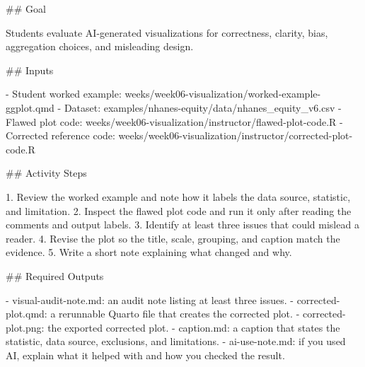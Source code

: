 \documentclass[
  letterpaper,
  DIV=11,
  numbers=noendperiod,
  oneside]{scrreprt}
\newenvironment{Shaded}{\begin{snugshade}}{\end{snugshade}}
\newcommand{\FunctionTok}[1]{\textcolor[rgb]{0.28,0.35,0.67}{#1}}
\newcommand{\InformationTok}[1]{\textcolor[rgb]{0.37,0.37,0.37}{#1}}
\newcommand{\NormalTok}[1]{\textcolor[rgb]{0.00,0.23,0.31}{#1}}
\newcommand{\SpecialStringTok}[1]{\textcolor[rgb]{0.13,0.47,0.30}{#1}}
\begin{document}
\begin{Shaded}
\begin{Highlighting}[numbers=left,,]
\FunctionTok{\#\# Goal}

\NormalTok{Students evaluate AI{-}generated visualizations for correctness, clarity, bias, aggregation choices, and misleading design.}

\FunctionTok{\#\# Inputs}

\SpecialStringTok{{-} }\NormalTok{Student worked example: }\InformationTok{\textasciigrave{}weeks/week06{-}visualization/worked{-}example{-}ggplot.qmd\textasciigrave{}}
\SpecialStringTok{{-} }\NormalTok{Dataset: }\InformationTok{\textasciigrave{}examples/nhanes{-}equity/data/nhanes\_equity\_v6.csv\textasciigrave{}}
\SpecialStringTok{{-} }\NormalTok{Flawed plot code: }\InformationTok{\textasciigrave{}weeks/week06{-}visualization/instructor/flawed{-}plot{-}code.R\textasciigrave{}}
\SpecialStringTok{{-} }\NormalTok{Corrected reference code: }\InformationTok{\textasciigrave{}weeks/week06{-}visualization/instructor/corrected{-}plot{-}code.R\textasciigrave{}}

\FunctionTok{\#\# Activity Steps}

\SpecialStringTok{1. }\NormalTok{Review the worked example and note how it labels the data source, statistic, and limitation.}
\SpecialStringTok{2. }\NormalTok{Inspect the flawed plot code and run it only after reading the comments and output labels.}
\SpecialStringTok{3. }\NormalTok{Identify at least three issues that could mislead a reader.}
\SpecialStringTok{4. }\NormalTok{Revise the plot so the title, scale, grouping, and caption match the evidence.}
\SpecialStringTok{5. }\NormalTok{Write a short note explaining what changed and why.}

\FunctionTok{\#\# Required Outputs}

\SpecialStringTok{{-} }\InformationTok{\textasciigrave{}visual{-}audit{-}note.md\textasciigrave{}}\NormalTok{: an audit note listing at least three issues.}
\SpecialStringTok{{-} }\InformationTok{\textasciigrave{}corrected{-}plot.qmd\textasciigrave{}}\NormalTok{: a rerunnable Quarto file that creates the corrected plot.}
\SpecialStringTok{{-} }\InformationTok{\textasciigrave{}corrected{-}plot.png\textasciigrave{}}\NormalTok{: the exported corrected plot.}
\SpecialStringTok{{-} }\InformationTok{\textasciigrave{}caption.md\textasciigrave{}}\NormalTok{: a caption that states the statistic, data source, exclusions, and limitations.}
\SpecialStringTok{{-} }\InformationTok{\textasciigrave{}ai{-}use{-}note.md\textasciigrave{}}\NormalTok{: if you used AI, explain what it helped with and how you checked the result.}


\end{Highlighting}
\end{Shaded}
\end{document}
